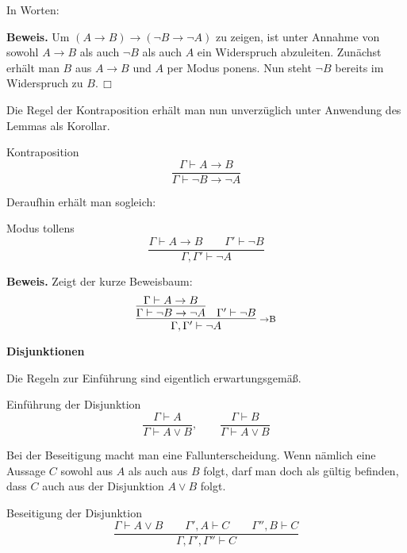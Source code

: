 \documentclass[8pt]{beamer}
\newcommand{\strong}[1]{\textsf{\textbf{#1}}}
\newcommand{\infernote}[1]{\!\text{\footnotesize #1}}
\renewcommand{\qedsymbol}{\ensuremath{\Box}}
\newcommand{\centerheadline}[1]{%
  \begin{center}\strong{#1}\end{center}}
\newcommand{\parspace}{\vspace{0.8em}}
\newcommand{\cond}{\rightarrow}
\begin{document}
\begin{frame}
In Worten:

\parspace
\strong{Beweis.}
Um $(A\cond B)\cond (\neg B\cond\neg A)$
zu zeigen, ist unter Annahme von sowohl $A\cond B$
als auch $\neg B$ als auch $A$ ein Widerspruch abzuleiten.
Zunächst erhält man $B$ aus $A\cond B$ und $A$
per Modus ponens. Nun steht $\neg B$ bereits im Widerspruch
zu $B$.\,\qedsymbol
\end{frame}

\begin{frame}
Die Regel der Kontraposition erhält man nun unverzüglich unter
Anwendung des Lemmas als Korollar.

\begin{block}{Kontraposition}
\[\dfrac{\Gamma\vdash A\cond B}{\Gamma\vdash\neg B\cond\neg A}\]
\end{block}\pause

Deraufhin erhält man sogleich:
\begin{block}{Modus tollens}
\[\dfrac{\Gamma\vdash A\cond B\qquad\Gamma'\vdash\neg B}{\Gamma,\Gamma'\vdash\neg A}\]
\end{block}\pause
\strong{Beweis.} Zeigt der kurze Beweisbaum:
\[\infer[\infernote{$\cond$B}]{\Gamma,\Gamma'\vdash\neg A}{
  \infer{\Gamma\vdash\neg B\cond\neg A}{\Gamma\vdash A\cond B}
& \Gamma'\vdash\neg B}
\]
\end{frame}

\begin{frame}
\centerheadline{Disjunktionen}
\end{frame}

\begin{frame}
Die Regeln zur Einführung sind eigentlich erwartungsgemäß.
\begin{block}{Einführung der Disjunktion}
\[\dfrac{\Gamma\vdash A}{\Gamma\vdash A\lor B},\qquad
\dfrac{\Gamma\vdash B}{\Gamma\vdash A\lor B}\]
\end{block}\pause

\parspace
Bei der Beseitigung macht man eine Fallunterscheidung. Wenn nämlich
eine Aussage $C$ sowohl aus $A$ als auch aus $B$ folgt, darf man doch
als gültig befinden, dass $C$ auch aus der Disjunktion $A\lor B$ folgt.\pause

\begin{block}{Beseitigung der Disjunktion}
\[\dfrac{\Gamma\vdash A\lor B\qquad\Gamma',A\vdash C\qquad\Gamma'',B\vdash C}{
  \Gamma,\Gamma',\Gamma''\vdash C}\]
\end{block}
\end{frame}
\end{document}
